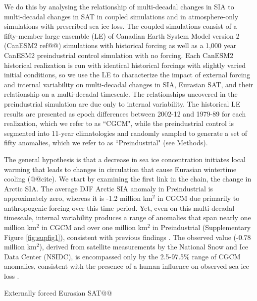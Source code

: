\documentclass{nature}
\begin{document}
We do this by analysing the relationship of multi-decadal changes in SIA to multi-decadal changes in SAT in coupled simulations and in atmosphere-only simulations with prescribed sea ice loss. The coupled simulations consist of a fifty-member large ensemble (LE) of Canadian Earth System Model version 2 (CanESM2 ref@@) simulations with historical forcing as well as a 1,000 year CanESM2 preindustrial control simulation with no forcing. Each CanESM2 historical realization is run with identical historical forcings with slightly varied initial conditions, so we use the LE to characterize the impact of external forcing and internal variability on multi-decadal changes in SIA, Eurasian SAT, and their relationship on a multi-decadal timescale. The relationships uncovered in the preindustrial simulation are due only to internal variability. The historical LE results are presented as epoch differences between 2002-12 and 1979-89 for each realization, which we refer to as ``CGCM", while the preindustrial control is segmented into 11-year climatologies and randomly sampled to generate a set of fifty anomalies, which we refer to as ``Preindustrial" (see Methods). 

The general hypothesis is that a decrease in sea ice concentration initiates local warming that leads to changes in circulation that cause Eurasian wintertime cooling (@@cite). We start by examining the first link in the chain, the change in Arctic SIA. The average DJF Arctic SIA anomaly in Preindustrial is approximately zero, whereas it is -1.2 million km$^2$ in CGCM due primarily to anthropogenic forcing over this time period. Yet, even on this multi-decadal timescale, internal variability produces a range of anomalies that span nearly one million km$^2$ in CGCM and over one million km$^2$ in Preindustrial (Supplementary Figure \ref{fig:supfig1}), consistent with previous findings \cite{swart15}. The observed value (-0.78 million km$^2$), derived from satellite measurements by the National Snow and Ice Data Center (NSIDC), is encompassed only by the 2.5-97.5\% range of CGCM anomalies, consistent with the presence of a human influence on observed sea ice loss \cite{min08}. %

Externally forced Eurasian SAT@@
\end{document}
